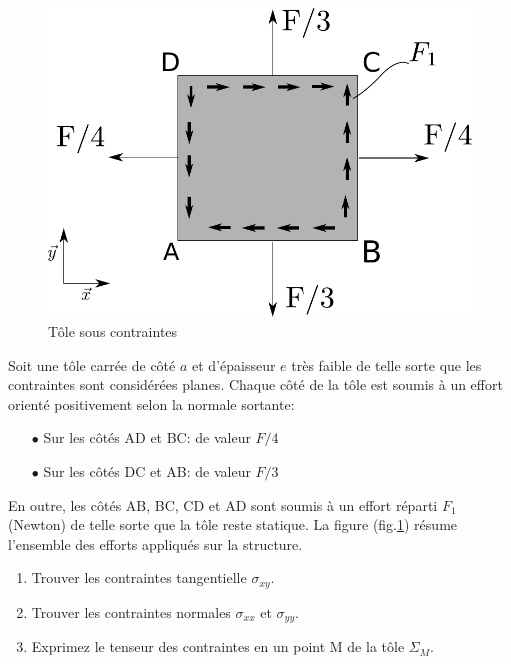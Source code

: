 \documentclass[lecture.tex]{subfiles}
\begin{document}

\begin{figure}[h]
  \centering
  \includegraphics[scale=0.5]{Contrainte_Tole.pdf}
  \caption{Tôle sous contraintes}
  \label{Tole_C}
\end{figure}

Soit une tôle carrée de côté $a$ et d'épaisseur $e$ très faible de telle sorte que les contraintes sont considérées planes. Chaque côté de la tôle est soumis à un effort orienté positivement selon la normale sortante:

\begin{itemize}
  \item[$\bullet$] Sur les côtés AD et BC: de valeur $F/4$
  \item[$\bullet$] Sur les côtés DC et AB: de valeur $F/3$
\end{itemize}

En outre, les côtés AB, BC, CD et AD sont soumis à un effort réparti $F_1$ (Newton) de telle sorte que la tôle reste statique. La figure (fig.\ref{Tole_C}) résume l'ensemble des efforts appliqués sur la structure.

\begin{enumerate}
  \item Trouver les contraintes tangentielle $\sigma_{xy}$.
  \item Trouver les contraintes normales $\sigma_{xx}$ et $\sigma_{yy}$.
  \item Exprimez le tenseur des contraintes en un point M de la tôle $\Sigma_M$.
\end{enumerate}

\finexercice
\end{document}
